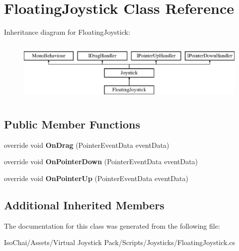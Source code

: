 \hypertarget{class_floating_joystick}{}\section{Floating\+Joystick Class Reference}
\label{class_floating_joystick}
Inheritance diagram for Floating\+Joystick\+:\begin{figure}[H]
\begin{center}
\leavevmode
\includegraphics[height=3.000000cm]{class_floating_joystick}
\end{center}
\end{figure}
\subsection*{Public Member Functions}
\begin{DoxyCompactItemize}
\item 
\mbox{\label{class_floating_joystick_a522d320721f122a99ba50701447eaf1f}} 
override void {\bfseries On\+Drag} (Pointer\+Event\+Data event\+Data)
\item 
\mbox{\label{class_floating_joystick_ae6793e17984d80f589de93afbd697bb9}} 
override void {\bfseries On\+Pointer\+Down} (Pointer\+Event\+Data event\+Data)
\item 
\mbox{\label{class_floating_joystick_af651ab0edbcbd7f644b81035c3e66d12}} 
override void {\bfseries On\+Pointer\+Up} (Pointer\+Event\+Data event\+Data)
\end{DoxyCompactItemize}
\subsection*{Additional Inherited Members}


The documentation for this class was generated from the following file\+:\begin{DoxyCompactItemize}
\item 
Iso\+Chai/\+Assets/\+Virtual Joystick Pack/\+Scripts/\+Joysticks/Floating\+Joystick.\+cs\end{DoxyCompactItemize}
